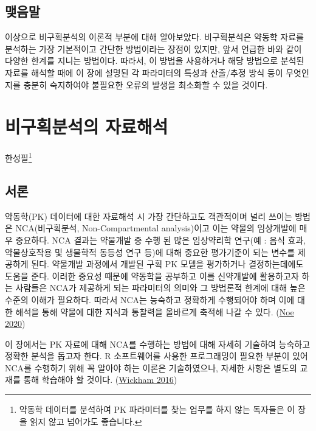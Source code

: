 \documentclass[
  11pt,
  krantz2, a4paper, twoside]{krantz}
\theoremstyle{definition}
\theoremstyle{definition}
\theoremstyle{definition}
\theoremstyle{definition}
\theoremstyle{remark}
\begin{document}
\hypertarget{uxb9fauxc74cuxb9d0-1}{%
\section{맺음말}\label{uxb9fauxc74cuxb9d0-1}}

이상으로 비구획분석의 이론적 부분에 대해 알아보았다.
비구획분석은 약동학 자료를 분석하는 가장 기본적이고 간단한 방법이라는 장점이 있지만, 앞서 언급한 바와 같이 다양한 한계를 지니는 방법이다. 
따라서, 이 방법을 사용하거나 해당 방법으로 분석된 자료를 해석할 때에 이 장에 설명된 각 파라미터의 특성과 산출/추정 방식 등이 무엇인지를 충분히 숙지하여야 불필요한 오류의 발생을 최소화할 수 있을 것이다.

\hypertarget{nca-analysis}{%
\chapter{비구획분석의 자료해석}\label{nca-analysis}}

\Large\hfill

한성필\footnote{약동학 데이터를 분석하여 PK 파라미터를 찾는 업무를 하지 않는 독자들은 이 장을 읽지 않고 넘어가도 좋습니다.}
\normalsize

\hypertarget{uxc11cuxb860-2}{%
\section{서론}\label{uxc11cuxb860-2}}

약동학(PK) 데이터에 대한 자료해석 시 가장 간단하고도 객관적이며 널리 쓰이는 방법은 NCA(비구획분석, Non-Compartmental analysis)이고 이는 약물의 임상개발에 매우 중요하다.
NCA 결과는 약물개발 중 수행 된 많은 임상약리학 연구(예 : 음식 효과, 약물상호작용 및 생물학적 동등성 연구 등)에 대해 중요한 평가기준이 되는 변수를 제공하게 된다.
약물개발 과정에서 개발된 구획 PK 모델을 평가하거나 결정하는데에도 도움을 준다.
이러한 중요성 때문에 약동학을 공부하고 이를 신약개발에 활용하고자 하는 사람들은 NCA가 제공하게 되는 파라미터의 의미와 그 방법론적 한계에 대해 높은 수준의 이해가 필요하다. 
따라서 NCA는 능숙하고 정확하게 수행되어야 하며 이에 대한 해석을 통해 약물에 대한 지식과 통찰력을 올바르게 축적해 나갈 수 있다. (\protect\hyperlink{ref-noe2020parameter}{Noe 2020})

이 장에서는 PK 자료에 대해 NCA를 수행하는 방법에 대해 자세히 기술하여 능숙하고 정확한 분석을 돕고자 한다. R 소프트웨어를 사용한 프로그래밍이 필요한 부분이 있어 NCA를 수행하기 위해 꼭 알아야 하는 이론은 기술하였으나, 자세한 사항은 별도의 교재를 통해 학습해야 할 것이다. (\protect\hyperlink{ref-ggplot22016}{Wickham 2016})
\end{document}
